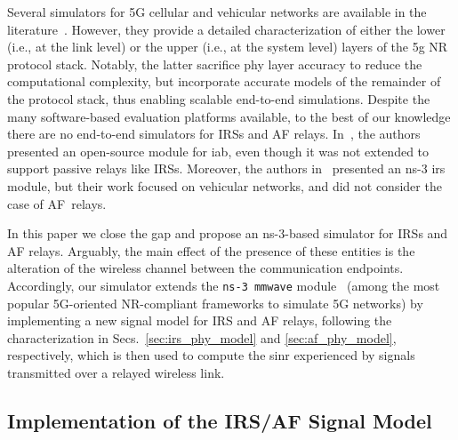 Several simulators for 5G cellular and vehicular networks are available in the literature~\cite{mezzavilla2018end,choi20195g, nardini2020simu5g, patriciello2019e2e, pratschner2018versatile, muller2018flexible, jao2018wise,drago2020millicar}. However, they provide a detailed characterization of either the lower (i.e., at the link level) or the upper (i.e., at the system level) layers of the \gls{5g} NR protocol stack. 
Notably, the latter sacrifice \gls{phy} layer accuracy to reduce the computational complexity, but incorporate accurate models of the remainder of the protocol stack, thus enabling scalable end-to-end simulations.
Despite the many software-based evaluation platforms available, to the best of our knowledge there are no end-to-end simulators for IRSs and AF relays. In~\cite{polese2018end}, the authors presented an open-source module for \gls{iab}, even though it was not extended to support passive relays like IRSs. 
Moreover, the authors in~\cite{heimann2021modeling} presented an ns-3 \gls{irs} module, but their work focused on vehicular networks, and did not consider the case of AF~relays. 

In this paper we close the gap and propose an ns-3-based simulator for IRSs and AF relays.
Arguably, the main effect of the presence of these entities is the alteration of the wireless channel between the communication endpoints. 
Accordingly, our simulator extends the \texttt{ns-3 mmwave} module~\cite{mezzavilla2018end} (among the most popular 5G-oriented NR-compliant frameworks to simulate 5G networks) by implementing a new signal model for IRS and AF relays, following the characterization in Secs.~\ref{sec:irs_phy_model} and \ref{sec:af_phy_model}, respectively, which is then used to compute the \gls{sinr} experienced by signals transmitted over a relayed wireless link. 

 


\subsection{Implementation of the IRS/AF Signal Model} 
\label{sec:ext_ch_model}
 

